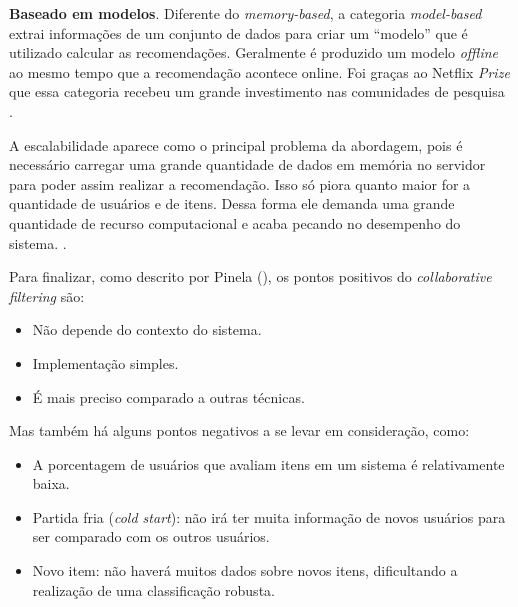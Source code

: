 
\textbf{Baseado em modelos}. Diferente do \textit{memory-based}, a categoria \textit{model-based} extrai informações de um conjunto de dados para criar um “modelo” que é utilizado calcular as recomendações. Geralmente é produzido um modelo \textit{offline} ao mesmo tempo que a recomendação acontece online. Foi graças ao Netflix \textit{Prize} que essa categoria recebeu um grande investimento nas comunidades de pesquisa \cite{Levinas2014AnAO}.

A escalabilidade aparece como o principal problema da abordagem, pois é necessário carregar uma grande quantidade de dados em memória no servidor para poder assim realizar a recomendação. Isso só piora quanto maior for a quantidade de usuários e de itens. Dessa forma ele demanda uma grande quantidade de recurso computacional e acaba pecando no desempenho do sistema. \cite{Grover:2017}.

Para finalizar, como descrito por Pinela (\citeyear{Pinela:2017}), os pontos positivos do \textit{collaborative filtering} são:

\begin{itemize}
    \item Não depende do contexto do sistema.
    
    \item Implementação simples.
    
    \item É mais preciso comparado a outras técnicas.
\end{itemize}

Mas também há alguns pontos negativos a se levar em consideração, como:

\begin{itemize}
    \item A porcentagem de usuários que avaliam itens em um sistema é relativamente baixa.
    
    \item Partida fria (\textit{cold start}): não irá ter muita informação de novos usuários para ser comparado com os outros usuários.
    
    \item Novo item: não haverá muitos dados sobre novos itens, dificultando a realização de uma classificação robusta.
\end{itemize}

